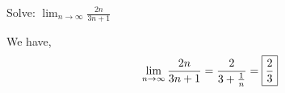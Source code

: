 \begin{exercise}
Solve: $\displaystyle\lim_{n\to\infty} \frac{2n}{3n+1}$
\begin{solution}
We have,
\[
  \lim_{n\to\infty} \frac{2n}{3n+1} = \frac{2}{3+\frac{1}{n}}=\fbox{$\displaystyle\frac23$}
\]
\end{solution}
\end{exercise}